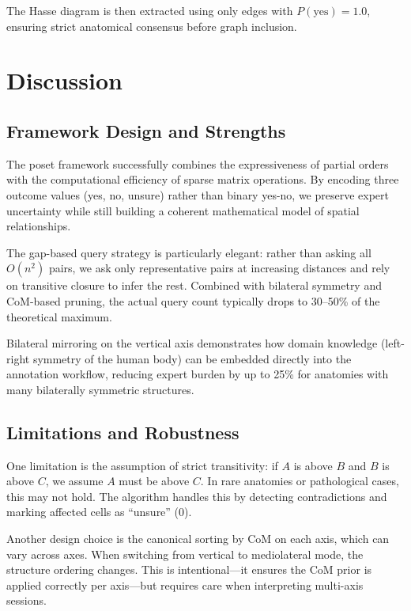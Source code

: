 \documentclass[12pt,a4paper]{article}
\begin{document}
The Hasse diagram is then extracted using only edges with $P(\text{yes}) = 1.0$, ensuring strict anatomical consensus before graph inclusion.

\section{Discussion}

\subsection{Framework Design and Strengths}

The poset framework successfully combines the expressiveness of partial orders with the computational efficiency of sparse matrix operations. By encoding three outcome values (yes, no, unsure) rather than binary yes-no, we preserve expert uncertainty while still building a coherent mathematical model of spatial relationships.

The gap-based query strategy is particularly elegant: rather than asking all $O(n^2)$ pairs, we ask only representative pairs at increasing distances and rely on transitive closure to infer the rest. Combined with bilateral symmetry and CoM-based pruning, the actual query count typically drops to 30–50\% of the theoretical maximum.

Bilateral mirroring on the vertical axis demonstrates how domain knowledge (left-right symmetry of the human body) can be embedded directly into the annotation workflow, reducing expert burden by up to 25\% for anatomies with many bilaterally symmetric structures.

\subsection{Limitations and Robustness}

One limitation is the assumption of strict transitivity: if $A$ is above $B$ and $B$ is above $C$, we assume $A$ must be above $C$. In rare anatomies or pathological cases, this may not hold. The algorithm handles this by detecting contradictions and marking affected cells as ``unsure'' (0).

Another design choice is the canonical sorting by CoM on each axis, which can vary across axes. When switching from vertical to mediolateral mode, the structure ordering changes. This is intentional—it ensures the CoM prior is applied correctly per axis—but requires care when interpreting multi-axis sessions.
\end{document}
